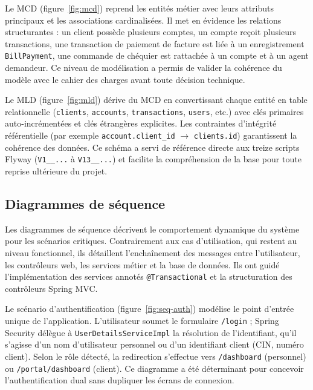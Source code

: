 \documentclass[11pt,a4paper,oneside]{report}
\begin{document}
Le MCD (figure~\ref{fig:mcd}) reprend les entités métier avec leurs attributs principaux et les associations cardinalisées. Il met en évidence les relations structurantes : un client possède plusieurs comptes, un compte reçoit plusieurs transactions, une transaction de paiement de facture est liée à un enregistrement \texttt{BillPayment}, une commande de chéquier est rattachée à un compte et à un agent demandeur. Ce niveau de modélisation a permis de valider la cohérence du modèle avec le cahier des charges avant toute décision technique.


Le MLD (figure~\ref{fig:mld}) dérive du MCD en convertissant chaque entité en table relationnelle (\texttt{clients}, \texttt{accounts}, \texttt{transactions}, \texttt{users}, etc.) avec clés primaires auto-incrémentées et clés étrangères explicites. Les contraintes d'intégrité référentielle (par exemple \texttt{account.client\_id} $\rightarrow$ \texttt{clients.id}) garantissent la cohérence des données. Ce schéma a servi de référence directe aux treize scripts Flyway (\texttt{V1\_\_...} à \texttt{V13\_\_...}) et facilite la compréhension de la base pour toute reprise ultérieure du projet.


\subsection{Diagrammes de séquence}

Les diagrammes de séquence décrivent le comportement dynamique du système pour les scénarios critiques. Contrairement aux cas d'utilisation, qui restent au niveau fonctionnel, ils détaillent l'enchaînement des messages entre l'utilisateur, les contrôleurs web, les services métier et la base de données. Ils ont guidé l'implémentation des services annotés \texttt{@Transactional} et la structuration des contrôleurs Spring MVC.

Le scénario d'authentification (figure~\ref{fig:seq-auth}) modélise le point d'entrée unique de l'application. L'utilisateur soumet le formulaire \texttt{/login} ; Spring Security délègue à \texttt{UserDetailsServiceImpl} la résolution de l'identifiant, qu'il s'agisse d'un nom d'utilisateur personnel ou d'un identifiant client (CIN, numéro client). Selon le rôle détecté, la redirection s'effectue vers \texttt{/dashboard} (personnel) ou \texttt{/portal/dashboard} (client). Ce diagramme a été déterminant pour concevoir l'authentification dual sans dupliquer les écrans de connexion.
\end{document}
